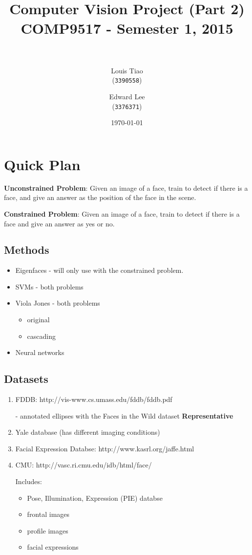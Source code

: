 \documentclass[11pt]{article} %
\title{ 
\normalfont \normalsize 
\horrule{0.5pt} \\[0.4cm] %
\Large Computer Vision Project (Part 2) \\ [0.1cm] %
\large COMP9517 - Semester 1, 2015 \\ [0.2cm]
\horrule{2pt} \\[0.5cm] %
}
\author{
  Louis Tiao \\
  (\texttt{3390558})
  \and
  Edward Lee\\
  (\texttt{3376371})
} %
\date{\normalsize\today} %
\theoremstyle{plain}
\theoremstyle{definition}
\theoremstyle{remark}
\numberwithin{equation}{section} %
\numberwithin{figure}{section} %
\numberwithin{table}{section} %
\begin{document}
\maketitle %

\section{Quick Plan}

\textbf{Unconstrained Problem}: Given an image of a face, train to detect if there is a face, and give an answer as the position of the face in the scene.

\textbf{Constrained Problem}: Given an image of a face, train to detect if there is a face and give an answer as yes or no.

\subsection{Methods}
\begin{itemize}
  \item Eigenfaces - will only use with the constrained problem.
  \item SVMs - both problems
  \item Viola Jones - both problems
  \begin{itemize}
    \item original
    \item cascading
  \end{itemize}
  \item Neural networks
\end{itemize}

\subsection{Datasets}
\begin{enumerate}
  \item FDDB: http://vis-www.cs.umass.edu/fddb/fddb.pdf 

    - annotated ellipses with the Faces in the Wild dataset
    \textbf{Representative}

  \item Yale database (has different imaging conditions)
  \item Facial Expression Databse: http://www.kasrl.org/jaffe.html
  \item CMU: http://vasc.ri.cmu.edu/idb/html/face/

  Includes:
  \begin{itemize}
    \item Pose, Illumination, Expression (PIE) databse
    \item frontal images
    \item profile images
    \item facial expressions
  \end{itemize}
\end{enumerate}
\end{document}
